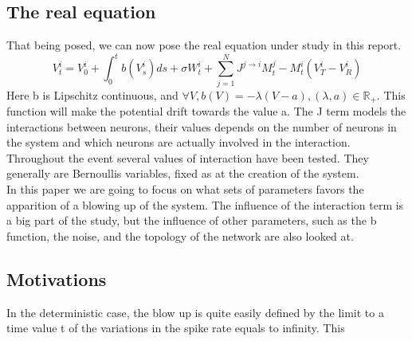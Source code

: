\subsection{The real equation}
	That being posed, we can now pose the real equation under study in this report.\\
	\[
		V_t^i=V_0^i+\int_0^tb(V_s^i)ds+\sigma W_t^i+\sum_{j=1}^NJ^{j\rightarrow i}M_t^j-M_t^i(V_T^i-V_R^i)
	\]
	Here b is Lipschitz continuous, and $\forall V, b(V)=-\lambda(V-a), (\lambda,a)\in\mathbb{R}_+$. This function will make the potential drift towards the value a. The J term models the interactions between neurons, their values depends on the number of neurons in the system and which neurons are actually involved in the interaction. \\
	Throughout the event several values of interaction have been tested. They generally are Bernoullis variables, fixed as at the creation of the system.\\
	In this paper we are going to focus on what sets of parameters favors the apparition of a blowing up of the system. The influence of the interaction term is a big part of the study, but the influence of other parameters, such as the b function, the noise, and the topology of the network are also looked at.\\

	\subsection{Motivations}
	In the deterministic case, the blow up is quite easily defined by the limit to a time value t of the variations in the spike rate equals to infinity. This 